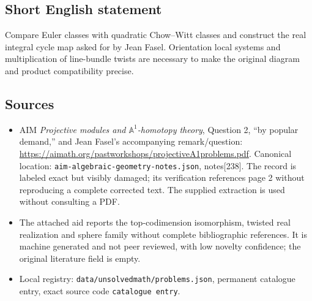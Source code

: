 \documentclass[11pt]{article}
\newcommand{\A}{\mathbb{A}}
\begin{document}
\subsection{Short English statement}
Compare Euler classes with quadratic Chow--Witt classes and construct the real integral cycle map asked for by Jean Fasel. Orientation local systems and multiplication of line-bundle twists are necessary to make the original diagram and product compatibility precise.
\subsection{Sources}
\begin{itemize}
\item AIM \emph{Projective modules and $\A^1$-homotopy theory}, Question 2, ``by popular demand,'' and Jean Fasel's accompanying remark/question: \url{https://aimath.org/pastworkshops/projectiveA1problems.pdf}. Canonical location: \texttt{aim-algebraic-geometry-notes.json}, notes[238]. The record is labeled exact but visibly damaged; its verification references page 2 without reproducing a complete corrected text. The supplied extraction is used without consulting a PDF.
\item The attached aid reports the top-codimension isomorphism, twisted real realization and sphere family without complete bibliographic references. It is machine generated and not peer reviewed, with low novelty confidence; the original literature field is empty.
\item Local registry: \texttt{data/unsolvedmath/problems.json}, permanent catalogue entry, exact source code \texttt{catalogue entry}.
\end{itemize}
\end{document}
